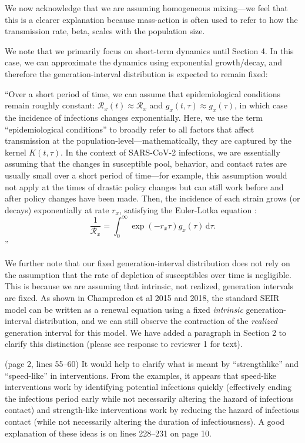 \documentclass[12pt]{article}
\newcommand{\RR}{\ensuremath{{\mathcal R}}\xspace}
\newcommand{\dd}[1]{\ensuremath{\, \mathrm{d}#1}}
\newcommand{\dtau}{\dd{\tau}}
\newcommand{\revtext}{\textsf}
\begin{document}
We now acknowledge that we are assuming homogeneous mixing---we feel that this is a clearer explanation because mass-action is often used to refer to how the transmission rate, beta, scales with the population size.

We note that we primarily focus on short-term dynamics until Section 4.
In this case, we can approximate the dynamics using exponential growth/decay, and therefore the generation-interval distribution is expected to remain fixed:

``Over a short period of time, we can assume that epidemiological conditions remain roughly constant: $\RR_x(t) \approx \RR_x$ and $g_x(t, \tau) \approx g_x(\tau)$, in which case the incidence of infections changes exponentially.
Here, we use the term ``epidemiological conditions'' to broadly refer to all factors that affect transmission at the population-level---mathematically, they are captured by the kernel $K(t, \tau)$.
In the context of SARS-CoV-2 infections, we are essentially assuming that the changes in susceptible pool, behavior, and contact rates are usually small over a short period of time---for example, this assumption would not apply at the times of drastic policy changes but can still work before and after policy changes have been made.
Then, the incidence of each strain grows (or decays) exponentially at rate $r_x$, satisfying the Euler-Lotka equation \citep{wallinga2007generation}:
\begin{equation}
\frac{1}{\RR_x} = \int_0^\infty \exp(- r_x \tau) g_x(\tau) \dtau.
\end{equation}''

We further note that our fixed generation-interval distribution does not rely on the assumption that the rate of depletion of susceptibles over time is negligible.
This is because we are assuming that intrinsic, not realized, generation intervals are fixed.
As shown in Champredon et al 2015 and 2018, the standard SEIR model can be written as a renewal equation using a fixed \emph{intrinsic} generation-interval distribution, and we can still observe the contraction of the \emph{realized} generation interval for this model.
We have added a paragraph in Section 2 to clarify this distinction (please see response to reviewer 1 for text).

\revtext{(page 2, lines 55–60) It would help to clarify what is meant by “strengthlike” and “speed-like” in interventions. From the examples, it appears that
speed-like interventions work by identifying potential infections quickly
(effectively ending the infectious period early while not necessarily altering
the hazard of infectious contact) and strength-like interventions work by
reducing the hazard of infectious contact (while not necessarily altering
the duration of infectiousness). A good explanation of these ideas is on
lines 228–231 on page 10.}
\end{document}
